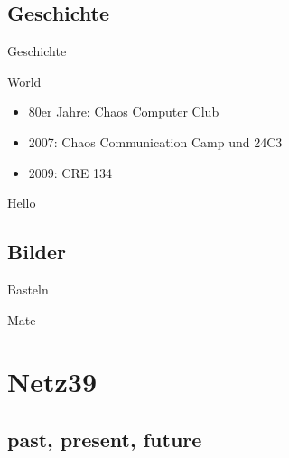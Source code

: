\documentclass{beamer}
\begin{document}
\subsection{Geschichte}

\begin{frame}[label=secgeschichte]{Geschichte}
    \begin{block}{World}
        \begin{itemize}
            \item 80er Jahre: Chaos Computer Club
            \item 2007: Chaos Communication Camp und 24C3
                \cite{Ohlig2007}
            \item 2009: CRE 134 \cite{Pritlove2009}
        \end{itemize}
    \end{block}
    \pause
    \begin{block}{Hello}
        \begin{center}
        \end{center}
    \end{block}
\end{frame}

\subsection{Bilder}

\begin{frame}[label=secreprap]{Basteln}
    \begin{figure}
    \end{figure}
\end{frame}

\begin{frame}[label=secmatetags]{Mate}
    \begin{figure}
    \end{figure}
\end{frame}

\section{Netz39}

\subsection{past, present, future}
\end{document}
